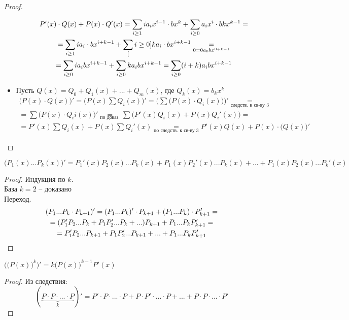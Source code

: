 \begin{props}
\begin{proof}
\begin{itemize}
\begin{itemize}
                \begin{multline*}
                    P'(x) \cdot Q(x) + P(x) \cdot Q'(x) = \sum_{i \ge 1} i a_i x^{i-1} \cdot b x^k + \sum_{i \ge 0} a_i x^i \cdot b k x ^{k-1} = \\ = \sum_{i \ge 1} i a_i \cdot b x ^{i + k - 1} + \sum_[i \ge 0] k a_i \cdot bx^{i + k - 1} \underset{0 = 0a_0bx^{0+k-1}}= \\ = \sum_{i \ge 0} i a_i bx^{i + k - 1} + \sum_{i \ge 0} ka_ibx^{i + k - 1} = \sum_{i \ge 0} (i+k) a_i bx^{i + k - 1} $$
                \end{multline*}
            \end{itemize}
        \item Пусть $Q(x) = Q_0 + Q_1(x) + ... + Q_m(x)$, где $Q_k(x) = b_kx^k$
        \begin{multline*}
            \bigg(P(x) \cdot Q(x) \bigg)' = \bigg(P(x) \sum Q_i(x) \bigg)' = \bigg( \sum \big(P(x) \cdot Q_i(x) \big) \bigg)' \underset{\text{следств. к св-ву 3}}= \\ = \sum \bigg(P(x) \cdot Q_ii(x) \bigg)' \underset{\text{по доказ.}}= \sum \bigg(P'(x) Q_i(x) + P(x) Q_i'(x) \bigg) = \\ = P'(x) \sum Q_i(x) + P(x) \sum Q_i'(x) \underset{\text{по следств. к св-ву 3}}= P'(x) Q(x) + P(x) \cdot \bigg(Q(x)\bigg)'
        \end{multline*}
        \end{itemize}
    \end{proof}
    \begin{implication}
    	$$ \bigg( P_1(x)...P_k(x) \bigg)' = P_1'(x)P_2(x)...P_k(x) + P_1(x)P_2'(x)...P_k(x) + ... + P_1(x)P_2(x)...P_k'(x) $$
    \end{implication}
    \begin{proof}
    	Индукция по $k$. \\
        База $k = 2$ -- доказано \\
        Переход.
        \begin{multline*}
            (P_1...P_k \cdot P_{k+1})' = (P_1...P_k)' \cdot P_{k+1} + (P_1...P_k) \cdot P_{k+1}' = \\ = (P_1'P_2...P_k + P_1P_2'...P_k + ...) P_{k+1} + P_1...P_kP_{k+1}' = \\ = P_1'P_2...P_{k+1} + P_1P_2'...P_{k+1} + ... + P_1...P_kP_{k+1}' $$
        \end{multline*}
    \end{proof}
    \item $\bigg(\big(P(x) \big)^k \bigg)' = k \bigg(P(x) \bigg)^{k-1} P'(x) $
    \begin{proof}
    	Из следствия:
        $$ (\underbrace{P \cdot P \cdot ... \cdot P}_k)' = P' \cdot P \cdot ... \cdot P + P \cdot P' \cdot ... \cdot P + ... + P \cdot P \cdot ... \cdot P' $$
    \end{proof}
\end{props}

